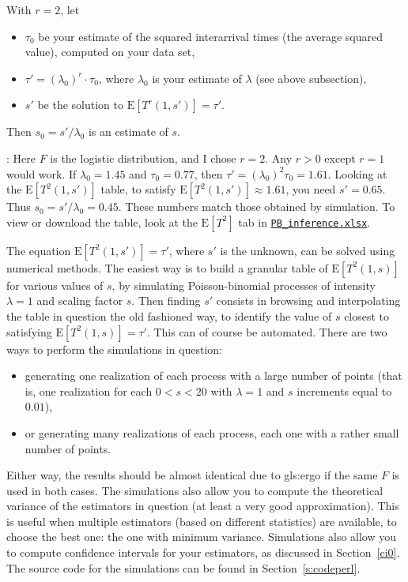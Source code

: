 \documentclass[10pt]{article}
\begin{document}
\noindent With $r=2$, let
\begin{itemize}
\item $\tau_0$ be your estimate of the squared interarrival times (the average squared value), computed on your data set,
\item $\tau'=(\lambda_0)^r \cdot \tau_0$, where $\lambda_0$ is your estimate of $\lambda$ (see above subsection),
\item $s'$ be the solution to $\mbox{E}[T^r(1, s')]=\tau'$.
\end{itemize}
Then $s_0=s'/\lambda_0$ is an estimate of $s$.

: Here $F$ is the logistic distribution, and I chose $r=2$. Any $r>0$ except $r=1$ would work. If $\lambda_0=1.45$ and $\tau_0=0.77$, then
$\tau'=(\lambda_0)^2 \tau_0=1.61$. Looking at the $\mbox{E}[T^2(1, s')]$ table, to satisfy $\mbox{E}[T^2(1, s')]\approx 1.61$, you need $s'=0.65$. Thus $s_0=s'/\lambda_0 = 0.45$. These numbers match those obtained by simulation.
To view or download the table, look at the $\mbox{E}[T^2]$ tab in \href{https://github.com/VincentGranville/Point-Processes/tree/main/Spreadsheets}{ \texttt{PB\_inference.xlsx}}.

The equation  $\mbox{E}[T^2(1, s')]=\tau'$, where $s'$ is the unknown, can be solved using numerical methods. The easiest way is to build
a granular table of $\mbox{E}[T^2(1, s)]$ for various values of $s$, by simulating Poisson-binomial processes of
intensity $\lambda=1$ and scaling factor $s$. Then finding $s'$ consists in browsing and interpolating the table in question the old fashioned way, to identify the value of $s$ closest to satisfying $\mbox{E}[T^2(1, s)]=\tau'$. This can of course be automated. There are two ways to perform the simulations in question:
\begin{itemize}
\item generating one realization of each process with a large number of points (that is, one realization for each $0<s<20$ with $\lambda=1$ and $s$ increments equal to $0.01$),
\item or generating many realizations of each process, each one with a rather small number of points.
\end{itemize}
Either way, the results should be almost identical due to \gls{gls:ergo} if the same $F$ is used in both cases. The simulations also allow you to compute the theoretical variance of the estimators in question (at least a very good approximation). This is useful when multiple estimators (based on different statistics) are available, to choose the best one: the one with minimum  variance. Simulations also allow you to compute \textcolor{index}{confidence intervals} for your estimators, as discussed in Section~\ref{ci0}. The source code for the simulations can be found in Section~\ref{s:codeperl}. \\
\end{document}
